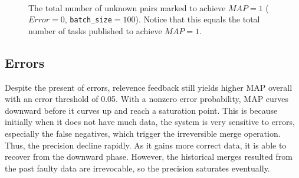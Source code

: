 \begin{figure}[h!]
  \label{fig:batchsizegraph}
  \centering
  \\
  \captionsetup{justification=centering}
  \caption{The total number of unknown pairs marked to achieve $MAP=1$ ($Error=0$, \texttt{batch\_size}$=100$). Notice that this equals the total number of tasks published to achieve $MAP=1$. }
\end{figure}


\subsection{Errors} %
\label{sub:errors_res}
Despite the present of errors, relevence feedback still yields higher MAP overall with an error threshold of 0.05. With a nonzero error probability, MAP curves downward before it curves up and reach a saturation point. This is because initially when it does not have much data, the system is very sensitive to errors, especially the false negatives, which trigger the irreversible merge operation. Thus, the precision decline rapidly. 
As it gains more correct data, it is able to recover from the downward phase. However, the historical merges resulted from the past faulty data are irrevocable, so the precision saturates eventually.


